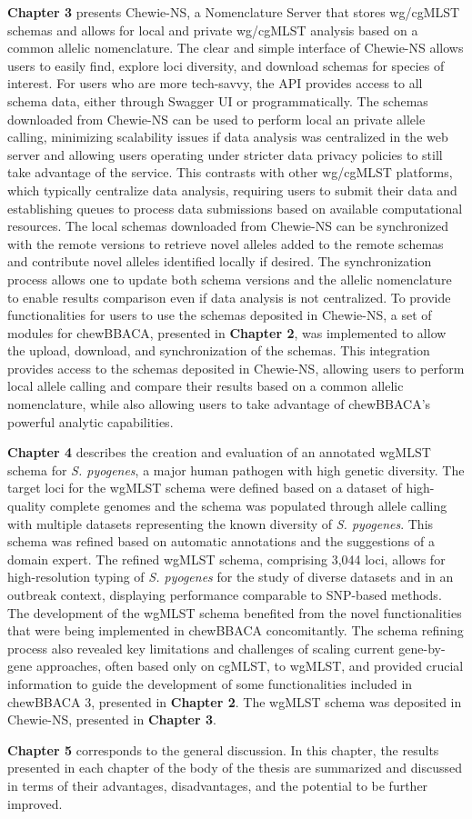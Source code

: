 \textbf{Chapter 3} presents Chewie-NS, a Nomenclature Server that stores wg/cgMLST schemas and allows for local and private wg/cgMLST analysis based on a common allelic nomenclature. The clear and simple interface of Chewie-NS allows users to easily find, explore loci diversity, and download schemas for species of interest. For users who are more tech-savvy, the API provides access to all schema data, either through Swagger UI or programmatically. The schemas downloaded from Chewie-NS can be used to perform local an private allele calling, minimizing scalability issues if data analysis was centralized in the web server and allowing users operating under stricter data privacy policies to still take advantage of the service. This contrasts with other wg/cgMLST platforms, which typically centralize data analysis, requiring users to submit their data and establishing queues to process data submissions based on available computational resources. The local schemas downloaded from Chewie-NS can be synchronized with the remote versions to retrieve novel alleles added to the remote schemas and contribute novel alleles identified locally if desired. The synchronization process allows one to update both schema versions and the allelic nomenclature to enable results comparison even if data analysis is not centralized. To provide functionalities for users to use the schemas deposited in Chewie-NS, a set of modules for chewBBACA, presented in \textbf{Chapter 2}, was implemented to allow the upload, download, and synchronization of the schemas. This integration provides access to the schemas deposited in Chewie-NS, allowing users to perform local allele calling and compare their results based on a common allelic nomenclature, while also allowing users to take advantage of chewBBACA's powerful analytic capabilities.

\textbf{Chapter 4} describes the creation and evaluation of an annotated wgMLST schema for \textit{S. pyogenes}, a major human pathogen with high genetic diversity. The target loci for the wgMLST schema were defined based on a dataset of high-quality complete genomes and the schema was populated through allele calling with multiple datasets representing the known diversity of \textit{S. pyogenes}. This schema was refined based on automatic annotations and the suggestions of a domain expert. The refined wgMLST schema, comprising 3,044 loci, allows for high-resolution typing of \textit{S. pyogenes} for the study of diverse datasets and in an outbreak context, displaying performance comparable to SNP-based methods. The development of the wgMLST schema benefited from the novel functionalities that were being implemented in chewBBACA concomitantly. The schema refining process also revealed key limitations and challenges of scaling current gene-by-gene approaches, often based only on cgMLST, to wgMLST, and provided crucial information to guide the development of some functionalities included in chewBBACA 3, presented in \textbf{Chapter 2}. The wgMLST schema was deposited in Chewie-NS, presented in \textbf{Chapter 3}.

\textbf{Chapter 5} corresponds to the general discussion. In this chapter, the results presented in each chapter of the body of the thesis are summarized and discussed in terms of their advantages, disadvantages, and the potential to be further improved.

